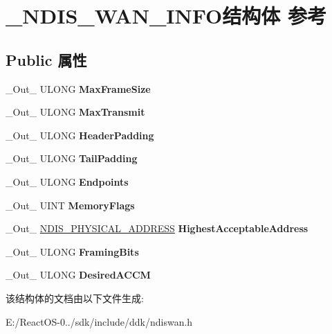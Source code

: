 \hypertarget{struct___n_d_i_s___w_a_n___i_n_f_o}{}\section{\+\_\+\+N\+D\+I\+S\+\_\+\+W\+A\+N\+\_\+\+I\+N\+F\+O结构体 参考}
\label{struct___n_d_i_s___w_a_n___i_n_f_o}
\subsection*{Public 属性}
\begin{DoxyCompactItemize}
\item 
\mbox{\label{struct___n_d_i_s___w_a_n___i_n_f_o_a6094e90b9eccbaf0c5c18a7081707e78}} 
\+\_\+\+Out\+\_\+ U\+L\+O\+NG {\bfseries Max\+Frame\+Size}
\item 
\mbox{\label{struct___n_d_i_s___w_a_n___i_n_f_o_a3d9a410db4cf8daed405b16b839b35a9}} 
\+\_\+\+Out\+\_\+ U\+L\+O\+NG {\bfseries Max\+Transmit}
\item 
\mbox{\label{struct___n_d_i_s___w_a_n___i_n_f_o_a875753df3d9b9c2819c08abf750fe356}} 
\+\_\+\+Out\+\_\+ U\+L\+O\+NG {\bfseries Header\+Padding}
\item 
\mbox{\label{struct___n_d_i_s___w_a_n___i_n_f_o_a05874e9a7fd26d13f0481b5ac51b4790}} 
\+\_\+\+Out\+\_\+ U\+L\+O\+NG {\bfseries Tail\+Padding}
\item 
\mbox{\label{struct___n_d_i_s___w_a_n___i_n_f_o_a5c4709954d0ddcb85e061566f2524f10}} 
\+\_\+\+Out\+\_\+ U\+L\+O\+NG {\bfseries Endpoints}
\item 
\mbox{\label{struct___n_d_i_s___w_a_n___i_n_f_o_a84ac2323ae5efd4bdf0e235a7b8e450c}} 
\+\_\+\+Out\+\_\+ U\+I\+NT {\bfseries Memory\+Flags}
\item 
\mbox{\label{struct___n_d_i_s___w_a_n___i_n_f_o_aaea0d0ee0a6599b4538e65f7b4fbb37f}} 
\+\_\+\+Out\+\_\+ \hyperlink{union___l_a_r_g_e___i_n_t_e_g_e_r}{N\+D\+I\+S\+\_\+\+P\+H\+Y\+S\+I\+C\+A\+L\+\_\+\+A\+D\+D\+R\+E\+SS} {\bfseries Highest\+Acceptable\+Address}
\item 
\mbox{\label{struct___n_d_i_s___w_a_n___i_n_f_o_a9977be029abb1796a0445ea2680c51ac}} 
\+\_\+\+Out\+\_\+ U\+L\+O\+NG {\bfseries Framing\+Bits}
\item 
\mbox{\label{struct___n_d_i_s___w_a_n___i_n_f_o_a860ab4613f3fde8ad761dda940f24174}} 
\+\_\+\+Out\+\_\+ U\+L\+O\+NG {\bfseries Desired\+A\+C\+CM}
\end{DoxyCompactItemize}


该结构体的文档由以下文件生成\+:\begin{DoxyCompactItemize}
\item 
E\+:/\+React\+O\+S-\/0../sdk/include/ddk/ndiswan.\+h\end{DoxyCompactItemize}
